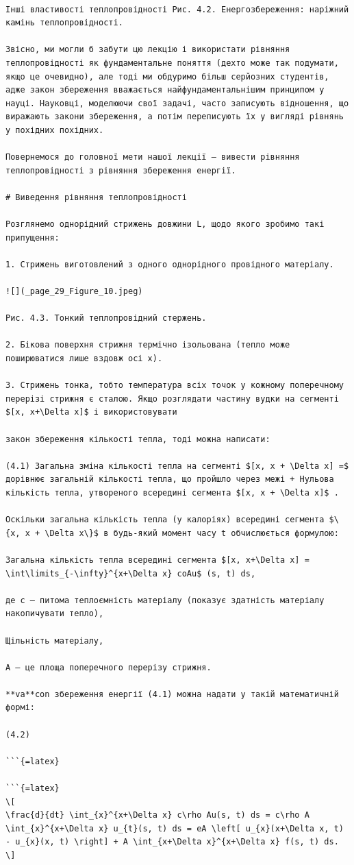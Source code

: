 \documentclass[
]{article}
\begin{document}
\begin{verbatim}

Інші властивості теплопровідності Рис. 4.2. Енергозбереження: наріжний камінь теплопровідності.

Звісно, ми могли б забути цю лекцію і використати рівняння теплопровідності як фундаментальне поняття (дехто може так подумати, якщо це очевидно), але тоді ми обдуримо більш серйозних студентів, адже закон збереження вважається найфундаментальнішим принципом у науці. Науковці, моделюючи свої задачі, часто записують відношення, що виражають закони збереження, а потім переписують їх у вигляді рівнянь у похідних похідних.

Повернемося до головної мети нашої лекції — вивести рівняння теплопровідності з рівняння збереження енергії.

# Виведення рівняння теплопровідності

Розглянемо однорідний стрижень довжини L, щодо якого зробимо такі припущення:

1. Стрижень виготовлений з одного однорідного провідного матеріалу.

![](_page_29_Figure_10.jpeg)

Рис. 4.3. Тонкий теплопровідний стержень.

2. Бікова поверхня стрижня термічно ізольована (тепло може поширюватися лише вздовж осі x).

3. Стрижень тонка, тобто температура всіх точок у кожному поперечному перерізі стрижня є сталою. Якщо розглядати частину вудки на сегменті $[x, x+\Delta x]$ і використовувати

закон збереження кількості тепла, тоді можна написати:

(4.1) Загальна зміна кількості тепла на сегменті $[x, x + \Delta x] =$ дорівнює загальній кількості тепла, що пройшло через межі + Нульова кількість тепла, утвореного всередині сегмента $[x, x + \Delta x]$ .

Оскільки загальна кількість тепла (у калоріях) всередині сегмента $\{x, x + \Delta x\}$ в будь-який момент часу t обчислюється формулою:

Загальна кількість тепла всередині сегмента $[x, x+\Delta x] = \int\limits_{-\infty}^{x+\Delta x} coAu$ (s, t) ds,

де c — питома теплоємність матеріалу (показує здатність матеріалу накопичувати тепло),

Щільність матеріалу,

A — це площа поперечного перерізу стрижня.

**va**con збереження енергії (4.1) можна надати у такій математичній формі:

(4.2)

```{=latex}

```{=latex}
\[
\frac{d}{dt} \int_{x}^{x+\Delta x} c\rho Au(s, t) ds = c\rho A \int_{x}^{x+\Delta x} u_{t}(s, t) ds = eA \left[ u_{x}(x+\Delta x, t) - u_{x}(x, t) \right] + A \int_{x+\Delta x}^{x+\Delta x} f(s, t) ds.
\]
\end{verbatim}
\end{document}

